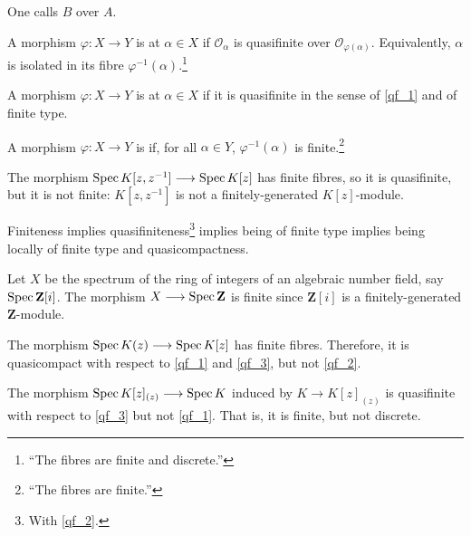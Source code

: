 \documentclass [11 pt, oneside] {article}
\begin{document}
One calls $B$  over $A$.
\begin{definition}[SGA I 2]\label{qf_1}\text{}
A morphism $\varphi:X\longrightarrow Y$ is  at $\alpha\in X$ if $\mathscr{O}_\alpha$ is quasifinite over $\mathscr{O}_{\varphi (\alpha)}$. Equivalently, $\alpha$ is isolated in its fibre $\varphi^{-1}(\alpha)$.\footnote{``The fibres are finite and discrete.''}
\end{definition}
\begin{definition}[EGA II 6.2]\label{qf_2}\text{} 
	A morphism $\varphi: X \longrightarrow Y$ is  at $\alpha\in X$ if it is quasifinite in the sense of \cref{qf_1} and of finite type. 
\end{definition}
\begin{definition}\label{qf_3}\text{}
A morphism $\varphi : X\longrightarrow Y$ is  if, for all $\alpha\in Y$, $\varphi^{-1}(\alpha)$ is finite.\footnote{``The fibres are finite.''}
\end{definition}
\begin{remark}\label{qfnf_1}
	The morphism $\operatorname{Spec} K[z,z^{-1}]\longrightarrow \operatorname{Spec} K[z]$ has finite fibres, so it is quasifinite, but it is not finite: $K[z,z^{-1}]$ is not a finitely-generated $K[z]$-module.
\end{remark}
\begin{remark}
	Finiteness implies quasifiniteness\footnote{With \cref{qf_2}.} implies being of finite type implies being locally of finite type and quasicompactness.
\end{remark}

\begin{example}[ ]\label{}\text{}
Let $X$ be the spectrum of the ring of integers of an algebraic number field, say $\operatorname{Spec} \mathbf{Z}[i]$. The morphism $X\longrightarrow \operatorname{Spec} \mathbf{Z}$ is finite since $\mathbf{Z}[i]$ is a finitely-generated $\mathbf{Z}$-module. 
\end{example}

\begin{example}[ ]\label{}\text{}
The morphism $\operatorname{Spec} K(z) \longrightarrow \operatorname{Spec} K[z]$ has finite fibres. Therefore, it is quasicompact with respect to \cref{qf_1} and \cref{qf_3}, but not \cref{qf_2}.
\end{example}

\begin{example}[ ]\label{}\text{}
The morphism $\operatorname{Spec} K[z]_{(z)} \longrightarrow \operatorname{Spec} K$ induced by $K\longrightarrow K[z]_{(z) }$ is quasifinite with respect to \cref{qf_3} but not \cref{qf_1}. That is, it is finite, but not discrete.
\end{example}
\end{document}
